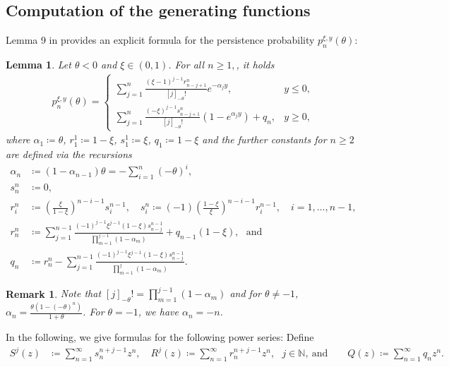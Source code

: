 \documentclass[10pt,a4paper]{amsart}
\newcommand{\N}{\mathbb{N}} %
\newcommand{\1}{\mathds{1}}
\newcommand{\s}{\mathscr{S}}
\newtheorem{Lemma}[definition]{Lemma}
\newtheorem{Remark}{Remark}
\begin{document}
\subsection{Computation of the generating functions}
Lemma 9 in \cite{AR} provides an explicit formula for the persistence probability $p_n^{\xi,y}(\theta)$:
\begin{Lemma}\label{pers_prob_neg_theta}
    Let $\theta<0$ and $\xi\in(0,1)$. For all $n\geq1,$, it holds
        \begin{align*}
        p_n^{\xi,y}(\theta)= \begin{cases}
        \sum_{j=1}^n\frac{(\xi-1)^{j-1}r^n_{n-j+1}}{[j]_{-\theta}!}e^{-\alpha_jy}, & y\leq 0,
       \\
       \sum_{j=1}^n\frac{(-\xi)^{j-1}s^n_{n-j+1}}{[j]_{-\theta}!}(1-e^{\alpha_jy})+q_n, & y\geq 0,
       \end{cases}
    \end{align*}
where $\alpha_1\coloneqq\theta$, $r_1^1\coloneqq 1-\xi$, $s_1^1\coloneqq \xi$, $q_1\coloneqq 1-\xi$ and the further constants for $n\ge 2$ are defined via the recursions
\begin{align*}
    \alpha_n&\coloneqq (1-\alpha_{n-1})\theta=-\sum_{i=1}^n(-\theta)^i,
    \\s_n^n&\coloneqq 0,
  \\ r_{i}^n&\coloneqq\left( \frac{\xi}{1-\xi}\right)^{n-i-1} s_{i}^{n-1}, \quad s_i^n\coloneqq(-1)\left( \frac{1-\xi}{\xi}\right)^{n-i-1} r_i^{n-1},\quad i=1,\ldots,n-1,
 \\ r_n^n&\coloneqq\sum_{j=1}^{n-1} \frac{(-1)^{j-1} \xi^{j-1} (1-\xi) s_{n-j}^{n-1}}{\prod_{m=1}^{j-1} (1-\alpha_m)}+ q_{n-1}(1-\xi),~~~\text{and}
 \\q_n&\coloneqq r_n^n- \sum_{j=1}^{n-1} \frac{(-1)^{j-1}\xi^{j-1} (1-\xi) s_{n-j}^{n-1}}{\prod_{m=1}^{j} (1-\alpha_m)}.
\end{align*}
\end{Lemma}
\begin{Remark}
    Note that $[j]_{-\theta}!=\prod_{m=1}^{j-1} (1-\alpha_m)$ and for $\theta\neq-1$, $\alpha_n=\frac{\theta(1-(-\theta)^n)}{1+\theta}$. For $\theta=-1$, we have $\alpha_n=-n$.
\end{Remark}
In the following, we give formulas for the following power series: Define
\begin{align*}
    S^j(z)&\coloneqq\sum_{n=1}^\infty s_n^{n+j-1}z^n,\quad R^j(z)\coloneqq\sum_{n=1}^\infty r_n^{n+j-1}z^n,~~~j\in\N,~\text{and}\qquad
    Q(z)\coloneqq\sum_{n=1}^\infty q_nz^n.
\end{align*}
\end{document}
